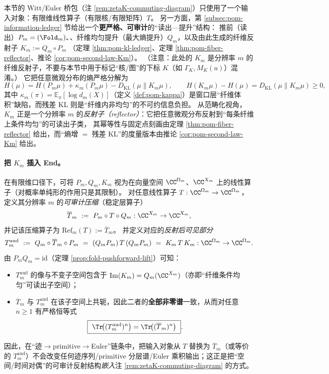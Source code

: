 \begin{remark}\label{rem:reflected-witt-euler-bridge}
本节的 Witt/Euler 桥包（注 \ref{rem:zetaK-commuting-diagram}）只使用了一个输入对象：有限维线性算子（有限核/有限矩阵）\(T\)。
另一方面，第 \ref{subsec:pom-information-ledger} 节给出一个\textbf{更严格、可审计}的“读出—提升”结构：
推前（读出）\(P_m=(\Fold_m)_*\)、纤维均匀提升（最大熵提升）\(Q_m\)，以及由此生成的纤维反射子 \(K_m:=Q_m\circ P_m\)
（定理 \ref{thm:pom-kl-ledger}、定理 \ref{thm:pom-fiber-reflector}、推论 \ref{cor:pom-second-law-Km}）。
（注意：此处的 \(K_m\) 是分辨率 \(m\) 的纤维反射子，不要与本节中用于标记“核/图”的下标 \(K\)（如 \(\Gamma_K,M_K(u)\)）混淆。）
它把任意微观分布的熵严格分解为
\[
H(\mu)=H(P_m\mu)+\kappa_m(P_m\mu)-D_{\mathrm{KL}}(\mu\|K_m\mu),
\qquad
H(K_m\mu)-H(\mu)=D_{\mathrm{KL}}(\mu\|K_m\mu)\ge 0,
\]
其中 \(\kappa_m(\pi)=\mathbb{E}_{\pi}[\log d_m(X)]\)（定义 \ref{def:pom-kappa}）是窗口层“纤维体积”缺陷，而残差 KL 则是“纤维内非均匀”的不可约信息负担。
从范畴化视角，\(K_m\) 正是一个分辨率 \(m\) 的\emph{反射子（reflector）}：它把任意微观分布反射到“每条纤维上条件均匀”的可读出子类，
其幂等性与固定点刻画由定理 \ref{thm:pom-fiber-reflector} 给出，而“熵增 \(=\) 残差 KL”的度量版本由推论 \ref{cor:pom-second-law-Km} 给出。

\paragraph{把 \(K_m\) 插入 End。}
在有限维口径下，可将 \(P_m,Q_m,K_m\) 视为在向量空间 \(\CC^{\Omega_m}\)、\(\CC^{X_m}\) 上的线性算子（对概率单纯形的作用只是其限制）。
对任意线性算子 \(T:\CC^{\Omega_m}\to\CC^{\Omega_m}\)，定义其分辨率 \(m\) 的\emph{可审计压缩}（稳定层算子）
\[
\overline T_m\ :=\ P_m\circ T\circ Q_m:\CC^{X_m}\to\CC^{X_m},
\]
并记该压缩算子为 \(\mathrm{Ref}_m(T):=\overline T_m\)。
并定义对应的\emph{反射后可见部分}
\[
T_m^{\mathrm{aud}}\ :=\ Q_m\circ \overline T_m\circ P_m
\ =\ (Q_mP_m)\,T\,(Q_mP_m)
\ =\ K_m\,T\,K_m:\CC^{\Omega_m}\to\CC^{\Omega_m}.
\]
由 \(P_mQ_m=\mathrm{id}\)（定理 \ref{prop:fold-pushforward-lift}）可知：
\begin{itemize}
  \item \(T_m^{\mathrm{aud}}\) 的像与不变子空间包含于 \(\mathrm{Im}(K_m)=Q_m(\CC^{X_m})\)（亦即“纤维条件均匀”可读出子空间）；
  \item \(\overline T_m\) 与 \(T_m^{\mathrm{aud}}\) 在该子空间上共轭，因此二者的\textbf{全部非零谱}一致，从而对任意 \(n\ge 1\) 有严格恒等式
  \[
  \boxed{\ \Tr\!\bigl((T_m^{\mathrm{aud}})^n\bigr)=\Tr\!\bigl((\overline T_m)^n\bigr)\ }.
  \]
\end{itemize}
因此，在“迹$\to$primitive$\to$Euler”链条中，把输入对象从 \(T\) 替换为 \(\overline T_m\)（或等价的 \(T_m^{\mathrm{aud}}\)）不会改变任何迹序列/primitive 分层谱/Euler 乘积输出；这正是把“空间/时间对偶”的可审计反射结构\emph{嵌入}注 \ref{rem:zetaK-commuting-diagram} 的方式。


\end{remark}
